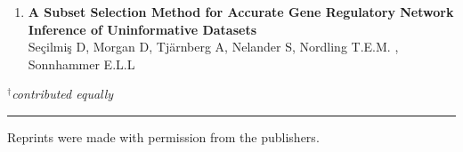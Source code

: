 \begin{enumerate}[P{A}PER I: ]
\item\textbf{A Subset Selection Method for Accurate Gene Regulatory Network Inference of Uninformative Datasets}\\
Seçilmiş D, Morgan D, Tj{\"a}rnberg A, Nelander S, Nordling T.E.M. , Sonnhammer E.L.L



\end{enumerate}
\noindent \emph{$^{\dagger}$contributed equally}

\noindent
\rule{\linewidth}{0.5mm}

\vspace{2mm}

\noindent
Reprints were made with permission from the publishers.\\
\noindent \\



